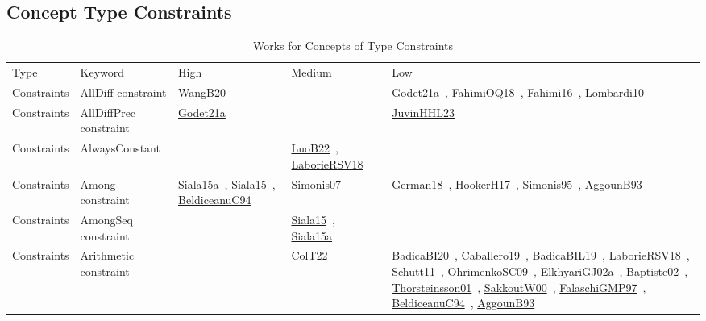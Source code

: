 \clearpage
\subsection{Concept Type Constraints}
\label{sec:Constraints}
{\scriptsize
\begin{longtable}{lp{3cm}>{\raggedright\arraybackslash}p{6cm}>{\raggedright\arraybackslash}p{6cm}>{\raggedright\arraybackslash}p{8cm}}
\rowcolor{white}\caption{Works for Concepts of Type Constraints}\\ \toprule
\rowcolor{white}Type & Keyword & High & Medium & Low\\ \midrule\endhead
\bottomrule
\endfoot
Constraints & AllDiff constraint & \href{../works/WangB20.pdf}{WangB20}~\cite{WangB20} &  & \href{../works/Godet21a.pdf}{Godet21a}~\cite{Godet21a}, \href{../works/FahimiOQ18.pdf}{FahimiOQ18}~\cite{FahimiOQ18}, \href{../works/Fahimi16.pdf}{Fahimi16}~\cite{Fahimi16}, \href{../works/Lombardi10.pdf}{Lombardi10}~\cite{Lombardi10}\\
Constraints & AllDiffPrec constraint & \href{../works/Godet21a.pdf}{Godet21a}~\cite{Godet21a} &  & \href{../works/JuvinHHL23.pdf}{JuvinHHL23}~\cite{JuvinHHL23}\\
Constraints & AlwaysConstant &  & \href{../works/LuoB22.pdf}{LuoB22}~\cite{LuoB22}, \href{../works/LaborieRSV18.pdf}{LaborieRSV18}~\cite{LaborieRSV18} & \\
Constraints & Among constraint & \href{../works/Siala15a.pdf}{Siala15a}~\cite{Siala15a}, \href{../works/Siala15.pdf}{Siala15}~\cite{Siala15}, \href{../works/BeldiceanuC94.pdf}{BeldiceanuC94}~\cite{BeldiceanuC94} & \href{../works/Simonis07.pdf}{Simonis07}~\cite{Simonis07} & \href{../works/German18.pdf}{German18}~\cite{German18}, \href{../works/HookerH17.pdf}{HookerH17}~\cite{HookerH17}, \href{../works/Simonis95.pdf}{Simonis95}~\cite{Simonis95}, \href{../works/AggounB93.pdf}{AggounB93}~\cite{AggounB93}\\
Constraints & AmongSeq constraint &  & \href{../works/Siala15.pdf}{Siala15}~\cite{Siala15}, \href{../works/Siala15a.pdf}{Siala15a}~\cite{Siala15a} & \\
Constraints & Arithmetic constraint &  & \href{../works/ColT22.pdf}{ColT22}~\cite{ColT22} & \href{../works/BadicaBI20.pdf}{BadicaBI20}~\cite{BadicaBI20}, \href{../works/Caballero19.pdf}{Caballero19}~\cite{Caballero19}, \href{../works/BadicaBIL19.pdf}{BadicaBIL19}~\cite{BadicaBIL19}, \href{../works/LaborieRSV18.pdf}{LaborieRSV18}~\cite{LaborieRSV18}, \href{../works/Schutt11.pdf}{Schutt11}~\cite{Schutt11}, \href{../works/OhrimenkoSC09.pdf}{OhrimenkoSC09}~\cite{OhrimenkoSC09}, \href{../works/ElkhyariGJ02a.pdf}{ElkhyariGJ02a}~\cite{ElkhyariGJ02a}, \href{../works/Baptiste02.pdf}{Baptiste02}~\cite{Baptiste02}, \href{../works/Thorsteinsson01.pdf}{Thorsteinsson01}~\cite{Thorsteinsson01}, \href{../works/SakkoutW00.pdf}{SakkoutW00}~\cite{SakkoutW00}, \href{../works/FalaschiGMP97.pdf}{FalaschiGMP97}~\cite{FalaschiGMP97}, \href{../works/BeldiceanuC94.pdf}{BeldiceanuC94}~\cite{BeldiceanuC94}, \href{../works/AggounB93.pdf}{AggounB93}~\cite{AggounB93}\\

\end{longtable}}
